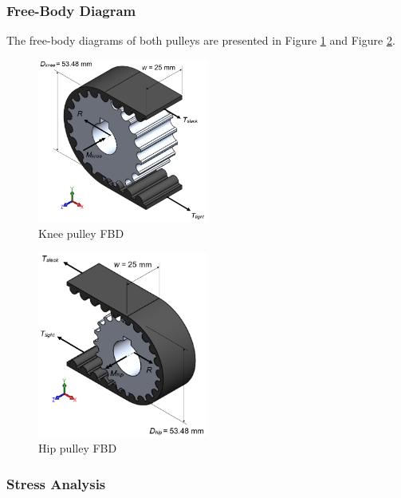 \subsubsection{Free-Body Diagram}

The free-body diagrams of both pulleys are presented in Figure \ref{fig:KneePulley} and Figure \ref{fig:HipPulley}.

\begin{figure}
    \centering
    \includegraphics[width=0.5\textwidth]{4_Analysis/img/Belt/Knee_Pulley_Ann.PNG}
    \caption{Knee pulley FBD}
    \label{fig:KneePulley}
\end{figure}
\begin{figure}
    \centering
    \includegraphics[width=0.5\textwidth]{4_Analysis/img/Belt/Hip_Pulley_Ann.PNG}
    \caption{Hip pulley FBD}
    \label{fig:HipPulley}
\end{figure}
\subsubsection{Stress Analysis}

